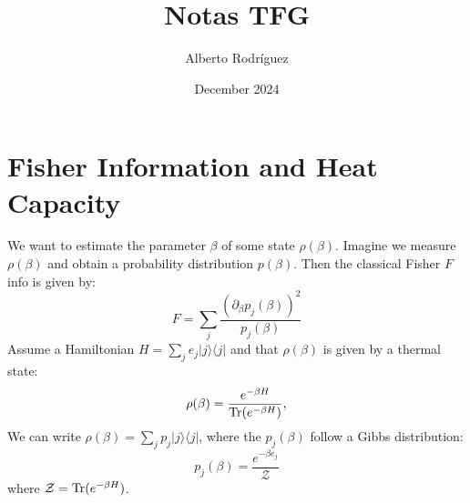 \documentclass{article}
\title{Notas TFG}
\author{Alberto Rodríguez}
\date{December 2024}
\begin{document}
\maketitle

\section{Fisher Information and Heat Capacity}
We want to estimate the parameter $\beta$ of some state $\rho(\beta)$. Imagine we measure $\rho(\beta)$ and obtain a probability distribution $p(\beta)$. Then the classical Fisher $F$ info is given by:
\begin{equation}
F = \sum_j \frac{(\partial_\beta p_j(\beta))^2}{p_j(\beta)}
\label{CFisher}
\end{equation}
Assume a Hamiltonian $H=\sum_j e_j |j \rangle \langle j| $ and that $\rho(\beta)$ is given by a thermal state:
\begin{equation}
\rho(\beta) = \frac{e^{-\beta H}}{{\rm Tr}(e^{-\beta H})},
\end{equation}
We can write $\rho(\beta)= \sum_j p_j  |j \rangle \langle j|$, where the $p_j(\beta)$ follow a Gibbs distribution:
\begin{equation}
    p_j(\beta) = \frac{e^{-\beta e_j}}{\mathcal{Z}}
\end{equation}
where $\mathcal{Z}= {\rm Tr}(e^{-\beta H})$.
\end{document}
